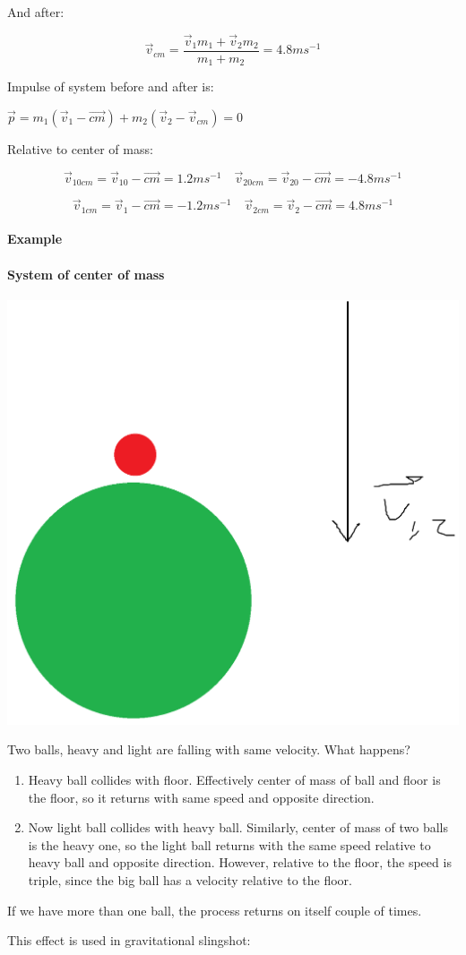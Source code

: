  And after:

$$\vec{v}_{cm} = \frac{\vec{v}_{1} m_1 + \vec{v}_{2} m_2 }{m_1+m_2} = 4.8 ms^{-1}$$

Impulse of system before and after is:

$\vec{p} = m_1 (\vec{v}_1 - \vec{cm}) + m_2(\vec{v}_2 -\vec{v}_{cm})= 0$

Relative to center of mass:

$$\vec{v}_{10cm} = \vec{v}_{10}-\vec{cm}= 1.2 ms^{-1} \quad \vec{v}_{20cm} = \vec{v}_{20}-\vec{cm}= -4.8 ms^{-1}$$

$$\vec{v}_{1cm} = \vec{v}_{1}-\vec{cm}= -1.2 ms^{-1} \quad \vec{v}_{2cm} = \vec{v}_{2}-\vec{cm}= 4.8 ms^{-1}$$

\paragraph{Example}


\paragraph{System of center of mass}
\begin{center}
	\includegraphics[width=0.2\linewidth]{./lect12/pic3.png}
\end{center}

Two balls, heavy and light are falling with same velocity. What happens?

\begin{enumerate}
	\item Heavy ball collides with floor. Effectively center of mass of ball and floor is the floor, so it returns with same speed and opposite direction.
	\item Now light ball collides with heavy ball. Similarly, center of mass of two balls is the heavy one, so the light ball returns with the same speed relative to heavy ball and opposite direction. However, relative to the floor, the speed is triple, since the big ball has a velocity relative to the floor.
\end{enumerate}

If we have more than one ball, the process returns on itself couple of times.

This effect is used in gravitational slingshot:


